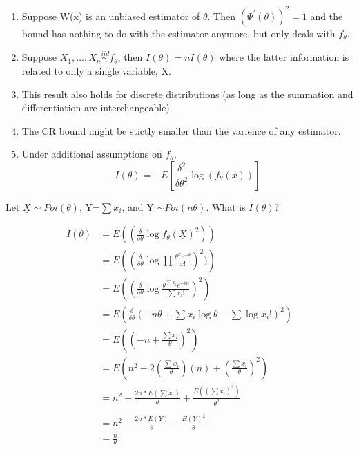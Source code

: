 \documentclass[11pt,fleqn]{book} %
\begin{document}
	\begin{remark}
		\begin{enumerate}[label = (\roman*)]
			\item Suppose W(x) is an unbiased estimator of $\theta$. Then $(\Psi^\prime(\theta))^2 = 1$ and the bound has nothing to do with the estimator anymore, but only deals with $f_\theta$.
			\item Suppose $X_1, \dots, X_n \stackrel{iid}{\sim} f_\theta$, then $I(\theta) = nI(\theta)$ where the latter information is related to only a single variable, X.
			\item This result also holds for discrete distributions (as long as the summation and differentiation are interchangeable).
			\item The CR bound might be stictly smaller than the varience of any estimator.
			\item Under additional assumptions on $f_\theta$, 
			$$I(\theta) = -E\left[\frac{\delta^2}{\delta \theta^2} \log(f_\theta(x))\right] $$ 
		\end{enumerate}
	\end{remark}

	\begin{exercise}
		Let $\underline{X} \sim Poi(\theta)$, Y=$\sum x_i$, and Y $\sim Poi(n\theta)$. What is $I(\theta)$?

		\begin{align*}
			I(\theta) &= E\left((\frac{\delta}{\delta \theta}\log f_\theta(\underline{X})^2) \right)\\
					&=E\left((\frac{\delta}{\delta \theta}\log \prod \frac{\theta^x e^{-\theta}}{x!})^2) \right)\\
					&= E\left((\frac{\delta}{\delta \theta}\log \frac{\theta^{\sum x_i} e^{-\theta n}}{\sum x_i!})^2 \right)\\
					&= E\left(\frac{\delta}{\delta \theta}(-n\theta + \sum x_i \log \theta - \sum \log x_i!)^2  \right)\\
					&= E\left((-n+\frac{\sum x_i}{\theta})^2 \right)\\
					&= E\left( n^2 - 2(\frac{\sum x_i}{\theta})(n)+(\frac{\sum x_i}{\theta})^2 \right)\\
					&= n^2 -\frac{2n * E(\sum x_i)}{\theta} + \frac{E((\sum x_i)^2)}{\theta^2}\\
					\\
					&=n^2 - \frac{2n*E(Y)}{\theta} + \frac{E(Y)^2}{\theta}\\
					&=\frac{n}{\theta}
		\end{align*}
	\end{exercise}
\end{document}

